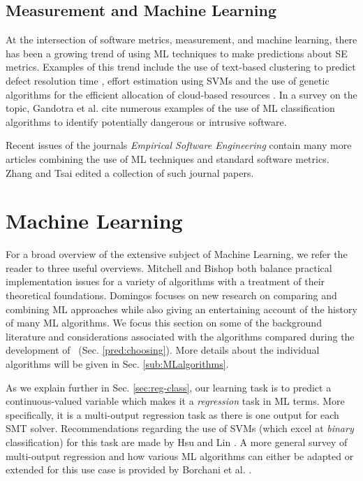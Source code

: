 \subsection{Measurement and Machine Learning}
\label{sub:lrmmml}

At the intersection of software metrics, measurement, and machine learning, there has been a growing trend of using ML techniques to make predictions about SE metrics. Examples of this trend include the use of text-based clustering to predict defect resolution time \cite{Assar2016}, effort estimation using SVMs \cite{Song:2014:PBR:2639490.2639510} and the use of genetic algorithms for the efficient allocation of cloud-based resources \cite{cloudML}. In a survey on the topic, Gandotra et al. \cite{ClassificationSurvey} cite numerous examples of the use of ML classification algorithms to identify potentially dangerous or intrusive software. 

Recent issues of the journals \textit{Empirical Software Engineering} contain many more articles combining the use of ML techniques and standard software metrics. Zhang and Tsai \cite{ML4SE} edited a collection of such journal papers.  

\section{Machine Learning}
\label{sec:lrml}

For a broad overview of the extensive subject of Machine Learning, we refer the reader to three useful overviews. 
Mitchell \cite{Mitchell} and Bishop \cite{Bishop} both balance practical implementation issues for a variety of algorithms with a treatment of their theoretical foundations. 
Domingos \cite{domingos2015master} focuses on new research on comparing and combining ML approaches while also giving an entertaining account of the history of many ML algorithms.  
We focus this section on some of the background literature and considerations associated with the algorithms compared during the development of \where~(Sec. \ref{pred:choosing}).
More details about the individual algorithms will be given in Sec. \ref{sub:MLalgorithms}.

As we explain further in Sec. \ref{sec:reg-class}, our learning task is to predict a continuous-valued variable which makes it a \textit{regression} task in ML terms. More specifically, it is a multi-output regression task as there is one output for each SMT solver. Recommendations regarding the use of SVMs (which excel at \textit{binary} classification) for this task are made by Hsu and Lin \cite{MulticlassSVM}. A more general survey of multi-output regression and how various ML algorithms can either be adapted or extended for this use case is provided by Borchani et al. \cite{multisurvey}. 

